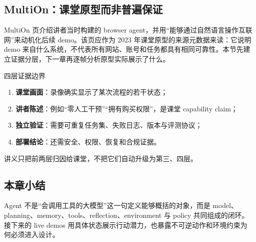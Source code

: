 
\subsection{MultiOn：课堂原型而非普遍保证}

MultiOn 页介绍讲者当时构建的 browser agent，并用“能够通过自然语言操作互联网”来动机化后续 demo。该页应作为 2023 年课堂原型的来源元数据来读：它说明 demo 来自什么系统，不代表所有网站、账号和任务都具有相同可靠性。本节先建立证据分层，下一章再逐帧分析原型实际展示了什么。


\begin{importantbox}{四层证据边界}
\begin{enumerate}
  \item \textbf{课堂画面}：录像确实显示了某次流程的若干状态；
  \item \textbf{讲者陈述}：例如“零人工干预”“拥有购买权限”，是课堂 capability claim；
  \item \textbf{独立验证}：需要可重复任务集、失败日志、版本与评测协议；
  \item \textbf{部署结论}：还需安全、权限、恢复和合规证据。
\end{enumerate}
讲义只把前两层归因给课堂，不把它们自动升级为第三、四层。
\end{importantbox}

\subsection{本章小结}

Agent 不是“会调用工具的大模型”这一句定义能够概括的对象，而是 model、planning、memory、tools、reflection、environment 与 policy 共同组成的闭环。接下来的 live demos 用具体状态展示行动潜力，也暴露不可逆动作和环境约束为何必须进入设计。

